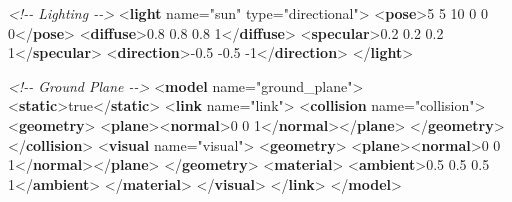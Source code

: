 \documentclass[
]{article}
\newenvironment{Shaded}{\begin{snugshade}}{\end{snugshade}}
\newcommand{\CommentTok}[1]{\textcolor[rgb]{0.56,0.35,0.01}{\textit{#1}}}
\newcommand{\KeywordTok}[1]{\textcolor[rgb]{0.13,0.29,0.53}{\textbf{#1}}}
\newcommand{\NormalTok}[1]{#1}
\newcommand{\OtherTok}[1]{\textcolor[rgb]{0.56,0.35,0.01}{#1}}
\newcommand{\StringTok}[1]{\textcolor[rgb]{0.31,0.60,0.02}{#1}}
\begin{document}
\begin{Shaded}
\begin{Highlighting}[]
    \CommentTok{\textless{}!{-}{-} Lighting {-}{-}\textgreater{}}
\NormalTok{    \textless{}}\KeywordTok{light}\OtherTok{ name=}\StringTok{"sun"}\OtherTok{ type=}\StringTok{"directional"}\NormalTok{\textgreater{}}
\NormalTok{      \textless{}}\KeywordTok{pose}\NormalTok{\textgreater{}5 5 10 0 0 0\textless{}/}\KeywordTok{pose}\NormalTok{\textgreater{}}
\NormalTok{      \textless{}}\KeywordTok{diffuse}\NormalTok{\textgreater{}0.8 0.8 0.8 1\textless{}/}\KeywordTok{diffuse}\NormalTok{\textgreater{}}
\NormalTok{      \textless{}}\KeywordTok{specular}\NormalTok{\textgreater{}0.2 0.2 0.2 1\textless{}/}\KeywordTok{specular}\NormalTok{\textgreater{}}
\NormalTok{      \textless{}}\KeywordTok{direction}\NormalTok{\textgreater{}{-}0.5 {-}0.5 {-}1\textless{}/}\KeywordTok{direction}\NormalTok{\textgreater{}}
\NormalTok{    \textless{}/}\KeywordTok{light}\NormalTok{\textgreater{}}

    \CommentTok{\textless{}!{-}{-} Ground Plane {-}{-}\textgreater{}}
\NormalTok{    \textless{}}\KeywordTok{model}\OtherTok{ name=}\StringTok{"ground\_plane"}\NormalTok{\textgreater{}}
\NormalTok{      \textless{}}\KeywordTok{static}\NormalTok{\textgreater{}true\textless{}/}\KeywordTok{static}\NormalTok{\textgreater{}}
\NormalTok{      \textless{}}\KeywordTok{link}\OtherTok{ name=}\StringTok{"link"}\NormalTok{\textgreater{}}
\NormalTok{        \textless{}}\KeywordTok{collision}\OtherTok{ name=}\StringTok{"collision"}\NormalTok{\textgreater{}}
\NormalTok{          \textless{}}\KeywordTok{geometry}\NormalTok{\textgreater{}}
\NormalTok{            \textless{}}\KeywordTok{plane}\NormalTok{\textgreater{}\textless{}}\KeywordTok{normal}\NormalTok{\textgreater{}0 0 1\textless{}/}\KeywordTok{normal}\NormalTok{\textgreater{}\textless{}/}\KeywordTok{plane}\NormalTok{\textgreater{}}
\NormalTok{          \textless{}/}\KeywordTok{geometry}\NormalTok{\textgreater{}}
\NormalTok{        \textless{}/}\KeywordTok{collision}\NormalTok{\textgreater{}}
\NormalTok{        \textless{}}\KeywordTok{visual}\OtherTok{ name=}\StringTok{"visual"}\NormalTok{\textgreater{}}
\NormalTok{          \textless{}}\KeywordTok{geometry}\NormalTok{\textgreater{}}
\NormalTok{            \textless{}}\KeywordTok{plane}\NormalTok{\textgreater{}\textless{}}\KeywordTok{normal}\NormalTok{\textgreater{}0 0 1\textless{}/}\KeywordTok{normal}\NormalTok{\textgreater{}\textless{}/}\KeywordTok{plane}\NormalTok{\textgreater{}}
\NormalTok{          \textless{}/}\KeywordTok{geometry}\NormalTok{\textgreater{}}
\NormalTok{          \textless{}}\KeywordTok{material}\NormalTok{\textgreater{}}
\NormalTok{            \textless{}}\KeywordTok{ambient}\NormalTok{\textgreater{}0.5 0.5 0.5 1\textless{}/}\KeywordTok{ambient}\NormalTok{\textgreater{}}
\NormalTok{          \textless{}/}\KeywordTok{material}\NormalTok{\textgreater{}}
\NormalTok{        \textless{}/}\KeywordTok{visual}\NormalTok{\textgreater{}}
\NormalTok{      \textless{}/}\KeywordTok{link}\NormalTok{\textgreater{}}
\NormalTok{    \textless{}/}\KeywordTok{model}\NormalTok{\textgreater{}}


\end{Highlighting}
\end{Shaded}
\end{document}

